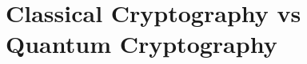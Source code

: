 \documentclass[handout, 10 pt]{beamer}
\begin{document}
\section{Classical Cryptography vs Quantum Cryptography}
\end{document}

